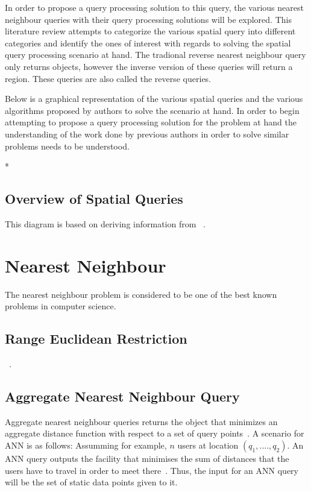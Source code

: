 \documentclass[a4paper,11pt]{article}
\begin{document}
In order to propose a query processing solution to this query, the various nearest neighbour queries with their query processing solutions will be explored. This literature review attempts to categorize the various spatial query into different categories and identify the ones of interest with regards to solving the spatial query processing scenario at hand. The tradional reverse nearest neighbour query only returns objects, however the inverse version of these queries will return a region. These queries are also called the reverse queries.

Below is a graphical representation of the various spatial queries and the various algorithms proposed by authors to solve the scenario at hand. In order to begin attempting to propose a query processing solution for the problem at hand the understanding of the work done by previous authors in order to solve similar problems needs to be understood. 

\/*
\subsection{Overview of Spatial Queries}

This diagram is based on deriving information from ~\cite{taniar2013taxonomy}.

\section{Nearest Neighbour}

The nearest neighbour problem is considered to be one of the best known problems in computer science. 

\subsection{Range Euclidean Restriction}

~\cite{papadias2003query}. 

\subsection{Aggregate Nearest Neighbour Query}

Aggregate nearest neighbour queries returns the object that minimizes an aggregate distance function with respect to a set of query points~\cite{yiu2005aggregate}. A scenario for ANN is as follows: Assumming for example, $n$ users at location $(q_1,....,q_2)$. An ANN query outputs the facility that minimises the sum of distances that the users have to travel in order to meet there~\cite{papadias2005aggregate}. Thus, the input for an ANN query will be the set of static data points given to it.
\end{document}
